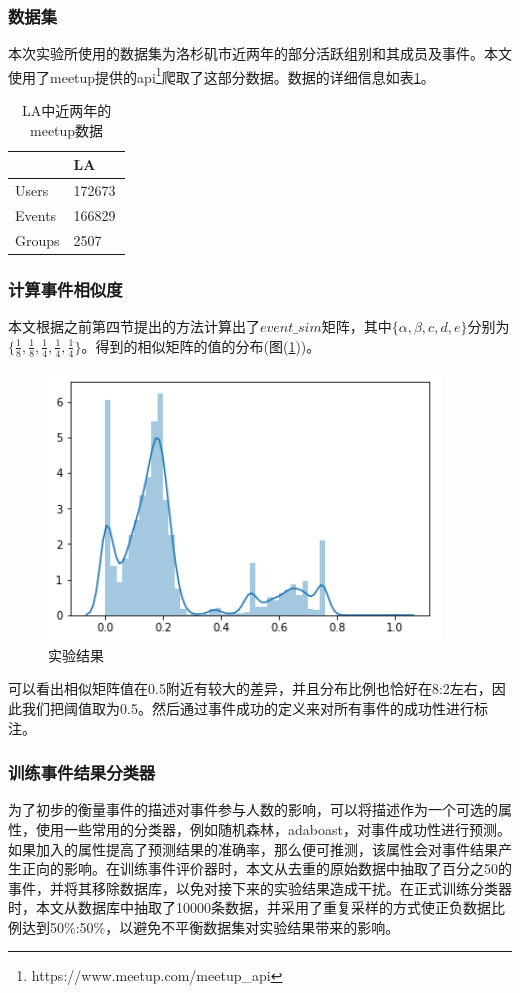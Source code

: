 \subsubsection{数据集}
本次实验所使用的数据集为洛杉矶市近两年的部分活跃组别和其成员及事件。本文使用了meetup提供的api\footnote{https://www.meetup.com/meetup\_api}爬取了这部分数据。数据的详细信息如表\ref{t1-1}。
\begin{table}[htbp] 
  \centering  
  \caption{\label{t1-1}LA中近两年的meetup数据}
    \begin{tabular*}{\linewidth}{p{0.5\linewidth}p{0.5\linewidth}}
\toprule
    & LA \\
\midrule
    Users & 172673\\
    Events & 166829\\
    Groups & 2507\\
\bottomrule
    \end{tabular*}
\end{table}

\subsubsection{计算事件相似度}
本文根据之前第四节提出的方法计算出了\(event\_sim\)矩阵，其中\(\{\alpha,\beta,{c},{d},{e}\}\)分别为\(\{\frac{1}{8},\frac{1}{8},\frac{1}{4},\frac{1}{4},\frac{1}{4}\}\)。得到的相似矩阵的值的分布(图(\ref{f1-1}))。

\begin{figure}[htbp]
  \centering
  \includegraphics[width=10.4cm]{event_sim_dist.png}
  \caption{实验结果}
  \label{f1-1}
\end{figure}

可以看出相似矩阵值在0.5附近有较大的差异，并且分布比例也恰好在8:2左右，因此我们把阈值取为0.5。然后通过事件成功的定义来对所有事件的成功性进行标注。

\subsubsection{训练事件结果分类器}
为了初步的衡量事件的描述对事件参与人数的影响，可以将描述作为一个可选的属性，使用一些常用的分类器，例如随机森林，adaboast，对事件成功性进行预测。如果加入的属性提高了预测结果的准确率，那么便可推测，该属性会对事件结果产生正向的影响。在训练事件评价器时，本文从去重的原始数据中抽取了百分之50的事件，并将其移除数据库，以免对接下来的实验结果造成干扰。在正式训练分类器时，本文从数据库中抽取了10000条数据，并采用了重复采样的方式使正负数据比例达到50\%:50\%，以避免不平衡数据集对实验结果带来的影响。

